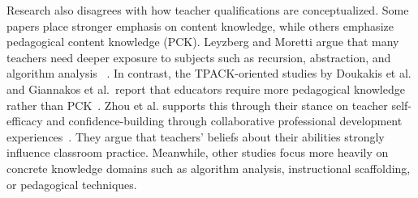 Research also disagrees with how teacher qualifications are conceptualized.
Some papers place stronger emphasis on content knowledge, while others emphasize pedagogical content knowledge (PCK).
Leyzberg and Moretti argue that many teachers need deeper exposure to subjects such as recursion, abstraction, and algorithm analysis
~\cite{leyzberg2017teaching}.
In contrast, the TPACK-oriented studies by Doukakis et al.
and Giannakos et al.\ report that educators require more pedagogical knowledge rather than PCK~\cite{doukakis2013measuring,giannakos2014examining}.
Zhou et al.
supports this through their stance on teacher self-efficacy and confidence-building through collaborative professional development experiences~\cite{zhou2020high}.
They argue that teachers' beliefs about their abilities strongly influence classroom practice.
Meanwhile, other studies focus more heavily on concrete knowledge domains such as algorithm analysis, instructional scaffolding, or pedagogical
  techniques.

